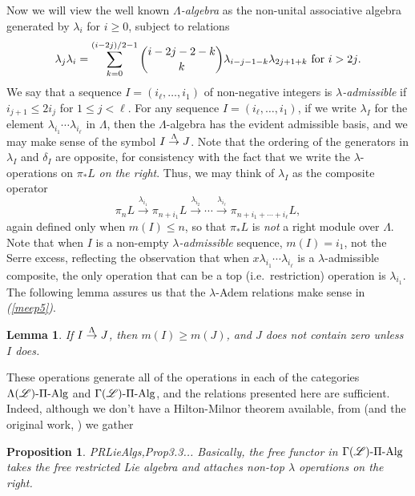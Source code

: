 \documentclass[11pt]{amsart}
\theoremstyle{plain}
\newtheorem{lem}[thm]{Lemma}
\newtheorem{prop}[thm]{Proposition}
\theoremstyle{definition}
\renewcommand{\to}{\longrightarrow}
\newcommand{\scrL}{\mathscr{L}}
\theoremstyle{plain}
\newcommand{\LieOperad}{{\scrL}}
\newcommand{\PiAlg}{\textup{-$\Pi$-Alg}}
\newcommand{\minDimDelta}{m}
\newcommand{\produces}[3]{#3:#1\sim #2}
\renewcommand{\produces}[3]{#1\rightarrow_{#3} #2}%
\renewcommand{\produces}[3]{#1\overset{\smash{#3}}{\rightarrow} #2}%
\begin{document}
\begin{Constructing (co)homotopy operations}
Now we will view the well known \emph{$\Lambda$-algebra} as the non-unital associative algebra generated by $\lambda_i$ for $i\geq0$, subject to relations \[\lambda_j\lambda_i=\sum_{k=0}^{(i-2j)/2-1}{i-2j-2-k\choose k}\lambda_{i-j-1-k}\lambda_{2j+1+k}\textup{\ for $i>2j$.}\]
We say that a sequence $I=(i_\ell,\ldots,i_1)$ of non-negative integers is \emph{$\lambda$-admissible} if $i_{j+1}\leq 2i_j$ for $1\leq j <\ell$. 
For any sequence $I=(i_\ell,\ldots,i_1)$, if we write $\lambda_I$ for the element $\lambda_{i_1}\cdots \lambda_{i_\ell}$ in $\Lambda$, then the $\Lambda$-algebra has the evident admissible basis, and we may make sense of the symbol $\produces{I}{J}{\Lambda}$. Note that the ordering of the generators in $\lambda_I$ and $\delta_I$ are opposite, for consistency with the fact that we write the $\lambda$-operations on $\pi_*L$ \emph{on the right}. Thus, we may think of $\lambda_I$ as the composite operator  
\[\pi_{n}L\overset{\lambda_{i_1}}{\to}\pi_{n+i_1}L\overset{\lambda_{i_2}}{\to}\cdots \overset{\lambda_{i_\ell}}{\to}\pi_{n+i_1+\cdots +i_\ell}L,\]
again defined only when $\minDimDelta(I)\leq n$, so that $\pi_*L$ is \emph{not} a right module over $\Lambda$.
Note that when $I$ is a non-empty \emph{$\lambda$-admissible} sequence,
$\minDimDelta(I)=i_1$, not the Serre excess, reflecting the observation that when $x\lambda_{i_1}\cdots \lambda_{i_\ell}$ is a $\lambda$-admissible composite, the only operation that  can be a top (i.e.\ restriction) operation is $\lambda_{i_1}$.
The following lemma assures us that the $\lambda$-Adem relations make sense in \emph{(\ref{meep5})}.
\begin{lem}\label{lemOnAdemChangeInMLambdaPlain}
If $\produces{I}{J}{\Lambda}$, then $\minDimDelta(I)\geq\minDimDelta(J)$, and $J$ does not contain zero unless $I$ does.
\end{lem}
These operations generate all of the operations in each of the categories $\Lambda(\LieOperad)\PiAlg$ and $\Gamma(\LieOperad)\PiAlg$, and the relations presented here are sufficient. Indeed, although we don't have a Hilton-Milnor theorem available, from \cite[Theorem 8.8 and proof]{CurtisSimplicialHtpy.pdf} (and the original work, \cite{6Author.pdf}) we gather
\begin{prop}
{\textup{PRLieAlgs,Prop3.3}}... Basically, the free functor in $\Gamma(\LieOperad)\PiAlg$ takes the free restricted Lie algebra and attaches non-top $\lambda$ operations on the right.
\end{prop}


\end{Constructing (co)homotopy operations}
\end{document}
